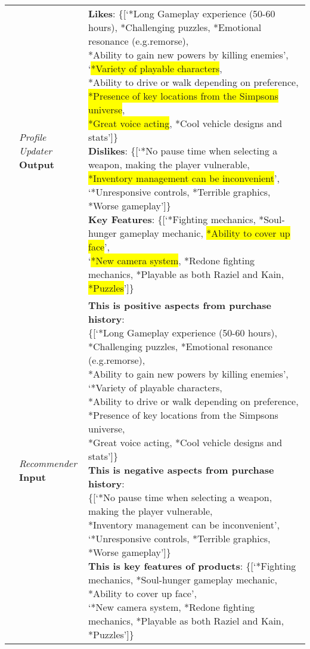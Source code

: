 \begin{table*}[t]
\begin{tabular}{@{}lll@{}}
    &  \makecell[l]{\emph{Profile Updater} \\ \textbf{Output}}       
    &        \makecell[l]{\textbf{Likes}: \{[`*Long Gameplay experience (50-60 hours), *Challenging puzzles, *Emotional resonance (e.g.remorse), \\ *Ability to gain new powers by killing enemies', `\colorbox{yellow}{*Variety of playable characters}, \\ *Ability to drive or walk depending on preference, \colorbox{yellow}{*Presence of key locations from the Simpsons universe}, \\\colorbox{yellow}{*Great voice acting}, *Cool vehicle designs and stats']\}\\ \textbf{Dislikes}: \{[`*No pause time when selecting a weapon, making the player vulnerable, \\\colorbox{yellow}{*Inventory management can be inconvenient}', `*Unresponsive controls, *Terrible graphics, *Worse gameplay']\} \\\textbf{Key Features}: \{[`*Fighting mechanics, *Soul-hunger gameplay mechanic, \colorbox{yellow}{*Ability to cover up face}', \\ `\colorbox{yellow}{*New camera system}, *Redone fighting mechanics, *Playable as both Raziel and Kain, \colorbox{yellow}{*Puzzles}']\}}\\ \cmidrule(lr){2-3}
    &  \makecell[l]{\emph{Recommender} \\ \textbf{Input}}                                    &         \makecell[l]{
    \textbf{This is positive aspects from purchase history}: \\\{[`*Long Gameplay experience (50-60 hours), *Challenging puzzles, *Emotional resonance (e.g.remorse), \\ *Ability to gain new powers by killing enemies', `*Variety of playable characters, \\ *Ability to drive or walk depending on preference, *Presence of key locations from the Simpsons universe, \\ *Great voice acting, *Cool vehicle designs and stats']\}
    \\\textbf{This is negative aspects from purchase history}:\\\{[`*No pause time when selecting a weapon, making the player vulnerable, \\ *Inventory management can be inconvenient', `*Unresponsive controls, *Terrible graphics, *Worse gameplay']\}
    \\\textbf{This is key features of products}: \{[`*Fighting mechanics, *Soul-hunger gameplay mechanic, *Ability to cover up face', \\ `*New camera system, *Redone fighting mechanics, *Playable as both Raziel and Kain, *Puzzles']\}
}
\end{tabular}
\end{table*}

